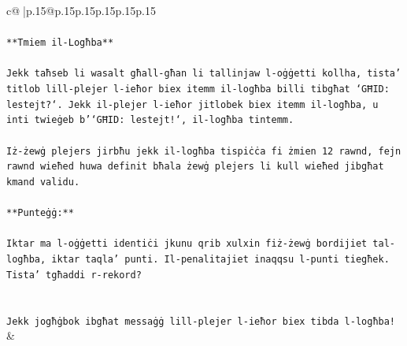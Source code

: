 \documentclass{article}
\begin{document}
{\begin{supertabular}{c@{$\;$}|p{.15\linewidth}@{}p{.15\linewidth}p{.15\linewidth}p{.15\linewidth}p{.15\linewidth}p{.15\linewidth}}
{{{\\ 
\\ 
\texttt{**Tmiem il{-}Logħba**} \\
\\ 
\texttt{Jekk taħseb li wasalt għall{-}għan li tallinjaw l{-}oġġetti kollha, tista' titlob lill{-}plejer l{-}ieħor biex itemm il{-}logħba billi tibgħat `GĦID: lestejt?`. Jekk il{-}plejer l{-}ieħor jitlobek biex itemm il{-}logħba, u inti twieġeb b'`GĦID: lestejt!`, il{-}logħba tintemm.} \\
\\ 
\texttt{Iż{-}żewġ plejers jirbħu jekk il{-}logħba tispiċċa fi żmien 12 rawnd, fejn rawnd wieħed huwa definit bħala żewġ plejers li kull wieħed jibgħat kmand validu.} \\
\\ 
\texttt{**Punteġġ:**} \\
\\ 
\texttt{Iktar ma l{-}oġġetti identiċi jkunu qrib xulxin fiż{-}żewġ bordijiet tal{-}logħba, iktar taqla' punti. Il{-}penalitajiet inaqqsu l{-}punti tiegħek. Tista' tgħaddi r{-}rekord?} \\
\\ 
\\ 
\texttt{Jekk jogħġbok ibgħat messaġġ lill{-}plejer l{-}ieħor biex tibda l{-}logħba!} \\
            }
        }
    }
    & \\ \\


\end{supertabular}}
\end{document}

